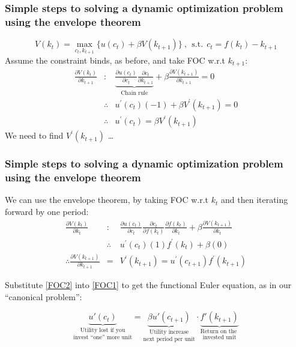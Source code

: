 \documentclass[10pt, handout]{beamer}
\begin{document}
\begin{frame}
\frametitle{Simple steps to solving a dynamic optimization problem using the envelope theorem}
\begin{equation}
V(k_{t}) = \max_{c_t, k_{t+1}} \{ u(c_t) +
\beta V(k_{t+1}) \} ~, ~~ {\text{s.t.}~~} c_t = f(k_{t}) - k_{t+1}
\end{equation}
Assume the constraint binds, as before, and take FOC w.r.t $k_{t+1}$:
\begin{eqnarray} \nonumber
\frac{\partial{V}(k_t)}{\partial{k}_{t+1}} &:& \underset{{\text{Chain rule}}}{\underbrace{\frac{\partial{u}(c_t)}{\partial{c}_{t}} \frac{\partial{c_t}}{\partial{k}_{t+1}}}} + \beta\frac{\partial{V}(k_{t+1})}{\partial{k}_{t+1}} = 0 \\ \nonumber
& \therefore & u^{\prime}(c_t)(-1) + {\beta}V^{\prime}(k_{t+1}) = 0 \\ \label{FOC1}
& \therefore & u^{\prime}(c_t) = {\beta}V^{\prime}(k_{t+1})
\end{eqnarray}
We need to find $V^{\prime}(k_{t+1})$ \ldots 

\end{frame}



\begin{frame}
\frametitle{Simple steps to solving a dynamic optimization problem using the envelope theorem}

We can use the envelope theorem, by taking FOC w.r.t $k_{t}$ and then iterating forward by one period:
\begin{eqnarray} \nonumber
\frac{\partial{V}(k_t)}{\partial{k}_{t}} &:& \frac{\partial{u}(c_t)}{\partial{c}_{t}}\frac{\partial{c_t}}{\partial{f(k_t)}} \frac{\partial{f(k_t)}}{\partial{k}_t} + \beta\frac{\partial{V}(k_{t+1})}{\partial{k}_{t}} \\ \nonumber
& \therefore & u^{\prime}(c_t)(1)f^{\prime}(k_t) + \beta (0)
 \\  \label{FOC2}
 \therefore \frac{\partial{V}(k_{t+1})}{\partial{k}_{t+1}} &=& V^{\prime}(k_{t+1}) =  u^{\prime}(c_{t+1})f^{\prime}(k_{t+1}) 
\end{eqnarray}


Substitute \eqref{FOC2} into \eqref{FOC1} to get the functional Euler equation, as in our ``canonical problem'':

\begin{equation}
\underset{\text{invest ``one'' more unit}}{\underset{\text{Utility lost if you}}{\underbrace{u'(c_t)}}} 
= 
\underset{\text{next period per unit}}{\underset{\text{Utility increase}}{\underbrace{\beta{u}'(c_{t+1})}}}  \cdot  \underset{\text{invested unit}}{\underset{\text{Return on the }}{\underbrace{f'(k_{t+1})}}}
\end{equation}

\end{frame}
\end{document}
